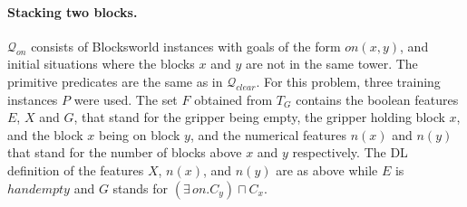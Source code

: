 \documentclass[letterpaper]{article} %
\newcommand{\Q}{\mathcal{Q}}
\begin{document}
% 

%

\paragraph{Stacking two blocks.}
$\Q_{on}$ consists  of Blocksworld instances with goals of the form $on(x,y)$,
and initial situations where the blocks $x$ and $y$ are not in the same tower.
The primitive predicates are the same as in $\Q_{clear}$.
For this problem, three training instances $P$ were used.
The set $F$ obtained from $T_G$ contains
% 
the boolean features  $E$, $X$ and $G$,  that stand for the gripper
being empty, the gripper holding block $x$, and the block $x$ being
on block $y$, and the numerical features  $n(x)$ and $n(y)$ that stand
for the number of blocks above $x$ and $y$ respectively.
The DL  definition of the  features $X$, $n(x)$, and $n(y)$ are as above
while $E$ is $handempty$ and $G$ stands for $(\exists\,on.C_y)  \sqcap C_x$.
%
\end{document}
